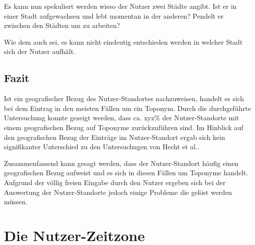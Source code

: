 			Es kann nun spekuliert werden wieso der Nutzer zwei Städte angibt.
			Ist er in einer Stadt aufgewachsen und lebt momentan in der anderen?
			Pendelt er zwischen den Städten um zu arbeiten?

			Wie dem auch sei, es kann nicht eindeutig entschieden werden in welcher Stadt sich der Nutzer aufhält.
			

		\subsection{Fazit}

			Ist ein geografischer Bezug des Nutzer-Standortes nachzuweisen, handelt es sich bei dem Eintrag in den meisten Fällen um ein Toponym.
			Durch die durchgeführte Untersuchung konnte gezeigt werden, dass ca. xyz\% der Nutzer-Standorte mit einem geografischen Bezug auf Toponyme zurückzuführen sind.
			Im Hinblick auf den geografischen Bezug der Einträge im Nutzer-Standort ergab sich kein signifikanter Unterschied zu den Untersuchugen von Hecht et al..

			Zusammenfassend kann gesagt werden, dass der Nutzer-Standort häufig einen geografischen Bezug aufweist und es sich in diesen Fällen um Toponyme handelt.
			Aufgrund der völlig freien Eingabe durch den Nutzer ergeben sich bei der Auswertung der Nutzer-Standorte jedoch einige Probleme die gelöst werden müssen.





	\section{Die Nutzer-Zeitzone}

